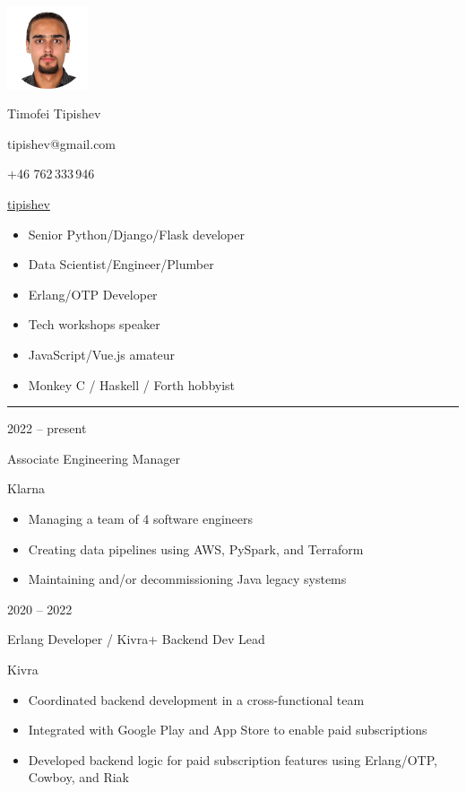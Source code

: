\documentclass[a4paper,10pt]{article}
\newlength{\cvcolumngapwidth}
\newlength{\cvleftcolumnwidth}
\newlength{\cvrightcolumnwidth}
\newcommand{\cvnamestyle}[1]{{\Large\cvnamefont\textcolor{cvnamecolor}{#1}}}
\newcommand{\cvsectionstyle}[1]{{\normalsize\cvsectionfont\textcolor{cvsectioncolor}{#1}}}
\newcommand{\cvtitlestyle}[1]{{\large\cvtitlefont\textcolor{cvtitlecolor}{#1}}}
\newcommand{\cvdurationstyle}[1]{{\small\cvdurationfont\textcolor{cvdurationcolor}{#1}}}
\newlength{\cvafteritemskipamount}
\newlength{\cvaftersectionskipamount}
\newlength{\cvafternameskipamount}
\newlength{\cvafterpersonalinfolineskipamount}
\newlength{\cvaftertitleskipamount}
\newlength{\cvparskip}
\newcommand{\cvpersonalinfo}[3]{
    \begin{minipage}[t]{\cvleftcolumnwidth}
        \vspace{0mm} %
        \raggedleft #1
    \end{minipage}%
    \hspace{\cvcolumngapwidth}%
    \begin{minipage}[t]{60mm}
        \vspace{0mm} %
        #2
    \end{minipage}
    \begin{minipage}[t]{70mm}
        \vspace{0mm} %
	#3
    \end{minipage}

    \vspace{\cvafteritemskipamount}
}
\newcommand{\cvname}[1]{
    \cvnamestyle{#1}

    \vspace{\cvafternameskipamount}
}
\newcommand{\cvpersonalinfolinewithicon}[3]{
    \raisebox{.5\fontcharht\font`E-.5\height}{\texttt{[image: \#2]}}
    #3

    \vspace{\cvafterpersonalinfolineskipamount}
}
\newcommand{\cvsection}[1]{
    \begin{minipage}[t]{\cvleftcolumnwidth}
        \raggedleft\cvsectionstyle{#1}
    \end{minipage}%
    \hspace{\cvcolumngapwidth}%
    \begin{minipage}[t]{\cvrightcolumnwidth}
        \textcolor{cvrulecolor}{\rule{\cvrightcolumnwidth}{0.3mm}}
    \end{minipage}

    \vspace{\cvaftersectionskipamount}
}
\newcommand{\cvitem}[2]{
    \begin{minipage}[t]{\cvleftcolumnwidth}
        \raggedleft #1
    \end{minipage}%
    \hspace{\cvcolumngapwidth}%
    \begin{minipage}[t]{\cvrightcolumnwidth}
        \setlength{\parskip}{\cvparskip} #2
    \end{minipage}

    \vspace{\cvafteritemskipamount}
}
\newcommand{\cvtitle}[1]{
    \cvtitlestyle{#1}

    \vspace{\cvaftertitleskipamount}
    \vspace{-\cvparskip}
}
\begin{document}

\cvpersonalinfo{
    \includegraphics[height=24mm]{me-circle.png}

}{
    \cvname{Timofei Tipishev}

    \cvpersonalinfolinewithicon{height=4mm}{070-envelop.pdf}{
        tipishev@gmail.com
    }


    \cvpersonalinfolinewithicon{height=4mm}{067-phone.pdf}{
        +46 762\,333\,946
    }

    \cvpersonalinfolinewithicon{height=4mm}{github.png}{
	    \href{https://github.com/tipishev}{tipishev}
    }
}{
	\begin{itemize}[leftmargin=*]
		\item Senior Python/Django/Flask developer
		\item Data Scientist/Engineer/Plumber
		\item Erlang/OTP Developer
		\item Tech workshops speaker
		\item JavaScript/Vue.js amateur
		\item Monkey C / Haskell / Forth hobbyist
	\end{itemize}
}



\cvsection{WORK EXPERIENCE}

\cvitem{
    \cvdurationstyle{2022 -- present}
}{
    \cvtitle{Associate Engineering Manager}

    Klarna

    \begin{itemize}[leftmargin=*]
       \item Managing a team of 4 software engineers
       \item Creating data pipelines using AWS, PySpark, and Terraform
       \item Maintaining and/or decommissioning Java legacy systems
    \end{itemize}
}

\cvitem{
    \cvdurationstyle{2020 -- 2022}
}{
    \cvtitle{Erlang Developer / Kivra+ Backend Dev Lead}

    Kivra

    \begin{itemize}[leftmargin=*]
       \item Coordinated backend development in a cross-functional team
       \item Integrated with Google Play and App Store to enable paid subscriptions
       \item Developed backend logic for paid subscription features using Erlang/OTP, Cowboy, and Riak
    \end{itemize}
}
\end{document}
